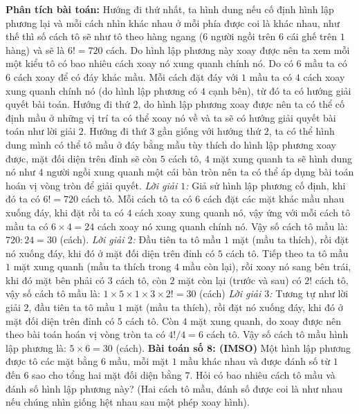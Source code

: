 \begin{multicols}{2}
\vskip 0.1cm
\textbf{\color{toancuabi}Phân tích bài toán:} Hướng đi thứ nhất, ta hình dung nếu cố định hình lập phương lại và mỗi cách nhìn khác nhau ở mỗi phía được coi là khác nhau, như thế thì số cách tô sẽ như tô theo hàng ngang ($6$ người ngồi trên $6$ cái ghế trên $1$ hàng) và sẽ là $6!=720$ cách. Do hình lập phương này xoay được nên ta xem mỗi một kiểu tô có bao nhiêu cách xoay nó xung quanh chính nó. Do có $6$ mầu ta có $6$ cách xoay để có đáy khác mầu. Mỗi cách đặt đáy với $1$ mầu ta có $4$ cách xoay xung quanh chính nó (do hình lập phương có $4$ cạnh bên), từ đó ta có hướng giải quyết bài toán.
\vskip 0.1cm
Hướng đi thứ $2$, do hình lập phương xoay được nên ta có thể cố định mầu ở những vị trí ta có thể xoay nó về và ta sẽ có hướng giải quyết bài toán như lời giải $2$.
\vskip 0.1cm
Hướng đi thứ $3$ gần giống với hướng thứ $2$, ta có thể hình dung mình có thể tô mầu ở đáy bằng mầu tùy thích do hình lập phương xoay được, mặt đối diện trên đỉnh sẽ còn $5$ cách tô, $4$ mặt xung quanh ta sẽ hình dung nó như $4$ người ngồi xung quanh một cái bàn tròn nên ta có thể áp dụng bài toán hoán vị vòng tròn để giải quyết.
\vskip 0.1cm
\textit{Lời giải $1$:}
Giả sử hình lập phương cố định, khi đó ta có $6!=720$ cách tô.
\vskip 0.1cm
Mỗi cách tô ta có $6$ cách đặt các mặt khác mầu nhau xuống đáy, khi đặt rồi ta có $4$ cách xoay xung quanh nó, vậy ứng với mỗi cách tô mầu ta có $6\times4=24$ cách xoay nó xung quanh chính nó. Vậy số cách tô mầu là: $720:24=30$ (cách).
\vskip 0.1cm
\textit{Lời giải $2$:}
Đầu tiên ta tô mầu $1$ mặt (mầu ta thích), rồi đặt nó xuống đáy, khi đó ở mặt đối diện trên đỉnh có $5$ cách tô.
\vskip 0.1cm
Tiếp theo ta tô mầu $1$ mặt xung quanh (mầu ta thích trong $4$ mầu còn lại), rồi xoay nó sang bên trái, khi đó mặt bên phải có $3$ cách tô, còn $2$ mặt còn lại (trước và sau) có $2!$ cách tô, vậy số cách tô mầu là: $1\times5\times1\times3\times2!=30$ (cách)
\vskip 0.1cm
\textit{Lời giải $3$:}
Tương tự như lời giải $2$, đầu tiên ta tô mầu $1$ mặt (mầu ta thích), rồi đặt nó xuống đáy, khi đó ở mặt đối diện trên đỉnh có $5$ cách tô.
\vskip 0.1cm
Còn $4$ mặt xung quanh, do xoay được nên theo bài toán hoán vị vòng tròn ta có $4!/4=6$ cách tô.
\vskip 0.1cm
Vậy số cách tô mầu hình lập phương là: $5\times 6=30$ (cách).
\vskip 0.1cm
\textbf{\color{toancuabi}Bài toán số $\pmb{8}$: (IMSO)}
\vskip 0.1cm
Một hình lập phương được tô các mặt bằng $6$ mầu, mỗi mặt $1$ mầu khác nhau và được đánh số từ $1$ đến $6$ sao cho tổng hai mặt đối diện bằng $7$. Hỏi có bao nhiêu cách tô mầu và đánh số hình lập phương này? (Hai cách tô mầu, đánh số được coi là như nhau nếu chúng nhìn giống hệt nhau sau một phép xoay hình). 

\end{multicols}
